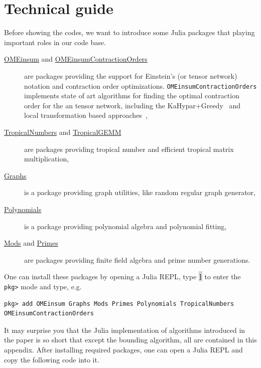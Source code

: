 \documentclass[onefignum, onetabnum]{siamart190516}
\newcommand{\<}{\langle}
\renewcommand{\>}{\rangle}
\begin{document}



\appendix

\section{Technical guide}\label{sec:technical}
Before showing the codes,
we want to introduce some Julia packages that playing important roles in our code base.

\begin{description}
	\item[\href{https://github.com/under-Peter/OMEinsum.jl}{OMEinsum} and \href{https://github.com/Happy-Diode/OMEinsumContractionOrders.jl}{OMEinsumContractionOrders}] are packages providing the support for Einstein's (or tensor network) notation and contraction order optimizations.
    \texttt{OMEinsumContractionOrders} implements state of art algorithms for finding the optimal contraction order for the an tensor network, including the KaHypar+Greedy~\cite{Gray2021, Pan2021} and local transformation based approaches~\cite{Kalachev2021},
	\item[\href{https://github.com/TensorBFS/TropicalNumbers.jl}{TropicalNumbers} and \href{https://github.com/TensorBFS/TropicalGEMM.jl}{TropicalGEMM}] are packages providing tropical number and efficient tropical matrix multiplication,
	\item[\href{https://github.com/JuliaGraphs/Graphs.jl}{Graphs}] is a package providing graph utilities, like random regular graph generator,
	\item[\href{https://github.com/JuliaMath/Polynomials.jl}{Polynomials}] is a package providing polynomial algebra and polynomial fitting,
	\item[\href{https://github.com/scheinerman/Mods.jl}{Mods} and \href{https://github.com/JuliaMath/Primes.jl}{Primes}] are packages providing finite field algebra and prime number generations.
\end{description}

One can install these packages by opening a Julia REPL, type \colorbox{lightgray}{\texttt{]}} to enter the \texttt{pkg>} mode and type, e.g.
\begin{lstlisting}
pkg> add OMEinsum Graphs Mods Primes Polynomials TropicalNumbers OMEinsumContractionOrders
\end{lstlisting}

It may surprise you that the Julia implementation of algorithms introduced in the paper is so short that except the bounding algorithm,
all are contained in this appendix. After installing required packages, one can open a Julia REPL and copy the following code into it.
\end{document}
